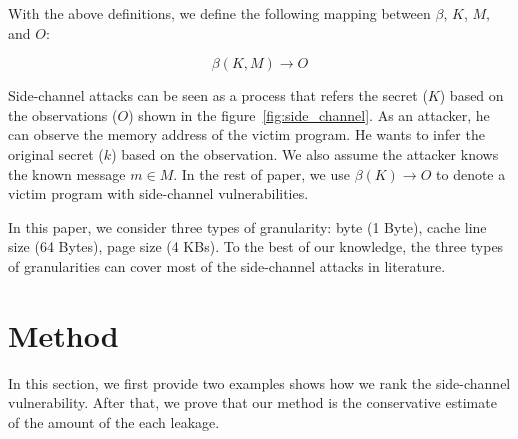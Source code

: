 With the above definitions, we define the following mapping between $\beta$,
$K$, $M$, and $O$:

\begin{displaymath}
  \beta(K, M) \rightarrow O
\end{displaymath}


Side-channel attacks can be seen as a process that refers the secret ($K$) based on the observations ($O$) shown in the figure~\ref{fig:side_channel}. As an attacker, he can observe the memory address of the victim program. He wants to infer the original secret ($k$) based on the observation. We also assume the attacker knows the known message $m \in M$. In the rest of paper, we use $\beta(K) \rightarrow O$ to denote a victim program with side-channel vulnerabilities.


In this paper, we consider three types of granularity: byte (1 Byte), cache line size (64 Bytes), page size (4 KBs). To the best of our knowledge, the three types of granularities can cover most of the side-channel attacks in literature.

\section{Method}
In this section, we first provide two examples shows how we rank the side-channel vulnerability. After that, we prove that our method is the conservative estimate of the amount of the each leakage.

